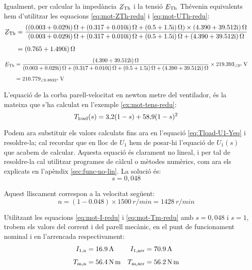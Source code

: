 \begin{exemple}
	Igualment, per calcular  la impedància $\cmplx{Z}\ped{Th}$ i la tensió $\cmplx{E}\ped{Th}$ Thévenin equivalents hem d'utilitzar les equacions \eqref{eq:mot-ZTh-redu} i \eqref{eq:mot-UTh-redu}:
	\begin{align*}
		\cmplx{Z}\ped{Th} &= \frac{(\complexqty{0,003+j0,029}{\ohm} + \complexqty{0,317+j0,010}{\ohm} +  \complexqty{0,5+j1,5}{\ohm})\times\complexqty{4,390+j39,512}{\ohm}}
		{\complexqty{0,003+j0,029}{\ohm} + \complexqty{0,317+j0,010}{\ohm} + \complexqty{0,5+j1,5}{\ohm}+\complexqty{4,390+j39,512}{\ohm}}  \\[1ex]   
		&= \complexqty{0,765+j1,490}{\ohm}
	\end{align*}
	\vspace{-5mm}
	\begin{align*}		
		\cmplx{E}\ped{Th}  &= \frac{\complexqty{4,390+j39,512}{\ohm}}
		{\complexqty{0,003+j0,029}{\ohm} + \complexqty{0,317+j0,010}{\ohm} + \complexqty{0,5+j1,5}{\ohm}+\complexqty{4,390+j39,512}{\ohm}}\times\qtypd{219,393}{0}{V}  \\[1ex]   
		&=  \qtypd{210,779}{0,8932}{V}
	\end{align*}
	
	L'equació de la corba parell-velocitat en newton metre del ventilador, és la mateixa que s'ha calculat en l'exemple  \ref{ex:mot-tens-redu}:
	\[
		T_\mathrm{load}(s) = 3{,}2 (1-s) + 58{,}9 (1-s)^2
	\]
	
	Podem ara substituir els  valors calculats fins ara en l'equació \eqref{eq:Tload-U1-Yeq} i resoldre-la; cal recordar que en lloc de $U_1$ hem de posar-hi l'equació de $U_1(s)$ que acabem de calcular. Aquesta equació és clarament no lineal, i per tal de resoldre-la cal utilitzar programes de càlcul o mètodes numèrics, com ara els explicats en l'apèndix \ref{sec:func-no-lin}. La solució és:
	\[
		s = 0{,}048
	\]
	
	Aquest lliscament correspon a la velocitat següent:
	\[
		n= (1-\num{0,048})\times \qty{1500}{r/min} = \qty{1428}{r/min}
	\]
	
	Utilitzant les equacions \eqref{eq:mot-I-redu} i \eqref{eq:mot-Tm-redu} amb $s=0{,}048$ i $s=1$, trobem els valors del corrent i del parell mecànic, en el punt de funcionament nominal i en l'arrencada respectivament:
	\begin{align*}
		I_\mathrm{1,n} &= \qty{16,9}{A} &
		I_\mathrm{1,arr} &= \qty{70,9}{A} \\[1ex] 
		T_\mathrm{m,n} &=  \qty{56,4}{N.m} &	
		T_\mathrm{m,arr} &=  \qty{56,2}{N.m}
	\end{align*}
	

\end{exemple}
